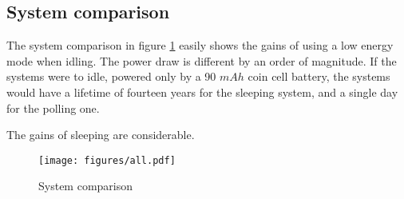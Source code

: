 \pagebreak

\subsection{System comparison}

The system comparison in figure \ref{fig:system-comparison} easily shows the gains of using a low energy mode when idling. The power draw is different by an order of magnitude. If the systems were to idle, powered only by a 90 $mAh$ coin cell battery, the systems would have a lifetime of fourteen years for the sleeping system, and a single day for the polling one.

The gains of sleeping are considerable.

\begin{figure}[h]
\centering
\texttt{[image: figures/all.pdf]}
\caption{System comparison}
\label{fig:system-comparison}
\end{figure}
